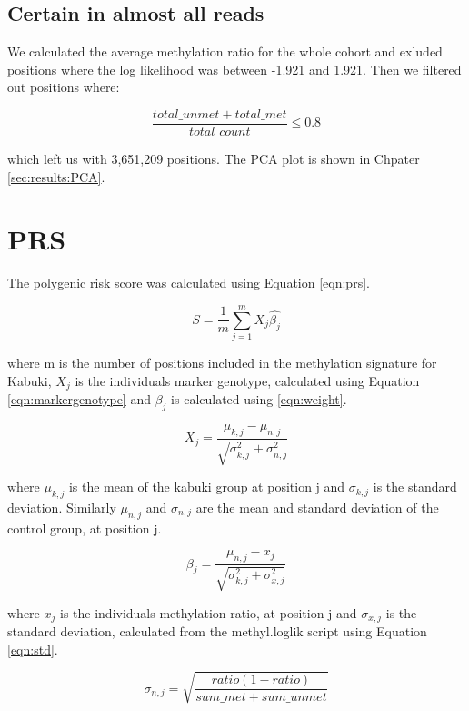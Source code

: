 \subsection{Certain in almost all reads}
We calculated the average methylation ratio for the whole cohort and exluded positions where the log likelihood was between -1.921 and 1.921. Then we filtered out positions where:

\begin{equation*}
    \frac{total\_unmet + total\_met}{total\_count} \leq 0.8
\end{equation*}
 
 which left us with 3,651,209 positions. The PCA plot is shown in Chpater \ref{sec:results:PCA}.
 
 \section{PRS}
 \label{sec:method:PRS}
The polygenic risk score was calculated using Equation \ref{eqn:prs}.

\begin{equation}
    \label{eqn:prs}
    S = \frac{1}{m}\sum_{j=1}^m X_j \hat{\beta_j}
\end{equation}

where m is the number of positions included in the methylation signature for Kabuki, $X_j$ is the individuals marker genotype, calculated using Equation \ref{eqn:markergenotype} and $\beta_j$ is calculated using \ref{eqn:weight}.

\begin{equation}
    \label{eqn:markergenotype}
    X_j = \frac{\mu_{k,j}-\mu_{n,j}}{\sqrt{\sigma^2_{k,j}}+\sigma^2_{n,j}}
\end{equation}

where $\mu_{k,j}$ is the mean of the kabuki group at position j and $\sigma_{k,j}$ is the standard deviation. Similarly $\mu_{n,j}$ and $\sigma_{n,j}$ are the mean and standard deviation of the control group, at position j.

\begin{equation}
    \label{eqn:weight}
    \beta_j = \frac{\mu_{n,j}-x_j}{\sqrt{\sigma_{k,j}^2+\sigma_{x,j}^2}}
\end{equation}

where  $x_j$ is the individuals methylation ratio, at position j and $\sigma_{x,j}$ is the standard deviation, calculated from the methyl.loglik script using Equation \ref{eqn:std}.

\begin{equation}
    \label{eqn:std}
    \sigma_{n,j} = \sqrt{\frac{ratio(1-ratio)}{sum\_met+sum\_unmet}}
\end{equation}

 
 
 






